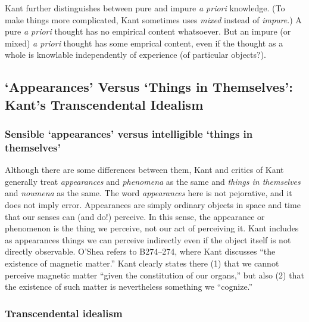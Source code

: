 \documentclass[12pt,letterpaper]{article}
\begin{document}
Kant further distinguishes between pure and impure \textit{a priori} knowledge.
(To make things more complicated, Kant sometimes uses \textit{mixed} instead of \textit{impure}.)
A pure \textit{a priori} thought has no empirical content whatsoever.
But an impure (or mixed) \textit{a priori} thought has some emprical content, even if the thought as a whole is knowlable independently of experience (of particular objects?).

\subsection*{`Appearances' Versus `Things in Themselves': Kant's Transcendental Idealism}


\subsubsection*{Sensible `appearances' versus intelligible `things in themselves'}

Although there are some differences between them, Kant and critics of Kant generally treat \textit{appearances} and \textit{phenomena} as the same and \textit{things in themselves} and \textit{noumena} as the same.
The word \textit{appearances} here is not pejorative, and it does not imply error.
Appearances are simply ordinary objects in space and time that our senses can (and do!) perceive.
In this sense, the appearance or phenomenon is the thing we perceive, not our act of perceiving it.
Kant includes as appearances things we can perceive indirectly even if the object itself is not directly observable.
O'Shea refers to B274--274, where Kant discusses ``the existence of magnetic matter.''
Kant clearly states there (1) that we cannot perceive magnetic matter ``given the constitution of our organs,'' but also (2) that the existence of such matter is nevertheless something we ``cognize.''

\subsubsection*{Transcendental idealism}
\end{document}
